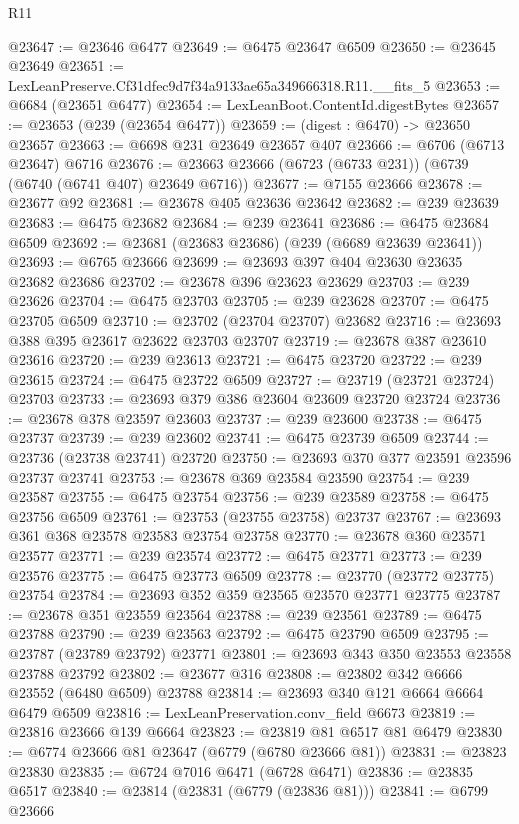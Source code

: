 \begin{lexlean}{R11}
\begin{coremodule}
@23647 := @23646 @6477
@23649 := @6475 @23647 @6509
@23650 := @23645 @23649
@23651 := LexLeanPreserve.Cf31dfec9d7f34a9133ae65a349666318.R11.__fits_5
@23653 := @6684 (@23651 @6477)
@23654 := LexLeanBoot.ContentId.digestBytes
@23657 := @23653 (@239 (@23654 @6477))
@23659 := (digest : @6470) -> @23650 @23657
@23663 := @6698 @231 @23649 @23657 @407
@23666 := @6706 (@6713 @23647) @6716
@23676 := @23663 @23666 (@6723 (@6733 @231)) (@6739 (@6740 (@6741 @407) @23649 @6716))
@23677 := @7155 @23666
@23678 := @23677 @92
@23681 := @23678 @405 @23636 @23642
@23682 := @239 @23639
@23683 := @6475 @23682
@23684 := @239 @23641
@23686 := @6475 @23684 @6509
@23692 := @23681 (@23683 @23686) (@239 (@6689 @23639 @23641))
@23693 := @6765 @23666
@23699 := @23693 @397 @404 @23630 @23635 @23682 @23686
@23702 := @23678 @396 @23623 @23629
@23703 := @239 @23626
@23704 := @6475 @23703
@23705 := @239 @23628
@23707 := @6475 @23705 @6509
@23710 := @23702 (@23704 @23707) @23682
@23716 := @23693 @388 @395 @23617 @23622 @23703 @23707
@23719 := @23678 @387 @23610 @23616
@23720 := @239 @23613
@23721 := @6475 @23720
@23722 := @239 @23615
@23724 := @6475 @23722 @6509
@23727 := @23719 (@23721 @23724) @23703
@23733 := @23693 @379 @386 @23604 @23609 @23720 @23724
@23736 := @23678 @378 @23597 @23603
@23737 := @239 @23600
@23738 := @6475 @23737
@23739 := @239 @23602
@23741 := @6475 @23739 @6509
@23744 := @23736 (@23738 @23741) @23720
@23750 := @23693 @370 @377 @23591 @23596 @23737 @23741
@23753 := @23678 @369 @23584 @23590
@23754 := @239 @23587
@23755 := @6475 @23754
@23756 := @239 @23589
@23758 := @6475 @23756 @6509
@23761 := @23753 (@23755 @23758) @23737
@23767 := @23693 @361 @368 @23578 @23583 @23754 @23758
@23770 := @23678 @360 @23571 @23577
@23771 := @239 @23574
@23772 := @6475 @23771
@23773 := @239 @23576
@23775 := @6475 @23773 @6509
@23778 := @23770 (@23772 @23775) @23754
@23784 := @23693 @352 @359 @23565 @23570 @23771 @23775
@23787 := @23678 @351 @23559 @23564
@23788 := @239 @23561
@23789 := @6475 @23788
@23790 := @239 @23563
@23792 := @6475 @23790 @6509
@23795 := @23787 (@23789 @23792) @23771
@23801 := @23693 @343 @350 @23553 @23558 @23788 @23792
@23802 := @23677 @316
@23808 := @23802 @342 @6666 @23552 (@6480 @6509) @23788
@23814 := @23693 @340 @121 @6664 @6664 @6479 @6509
@23816 := LexLeanPreservation.conv_field @6673
@23819 := @23816 @23666 @139 @6664
@23823 := @23819 @81 @6517 @81 @6479
@23830 := @6774 @23666 @81 @23647 (@6779 (@6780 @23666 @81))
@23831 := @23823 @23830
@23835 := @6724 @7016 @6471 (@6728 @6471)
@23836 := @23835 @6517
@23840 := @23814 (@23831 (@6779 (@23836 @81)))
@23841 := @6799 @23666

\end{coremodule}
\end{lexlean}

